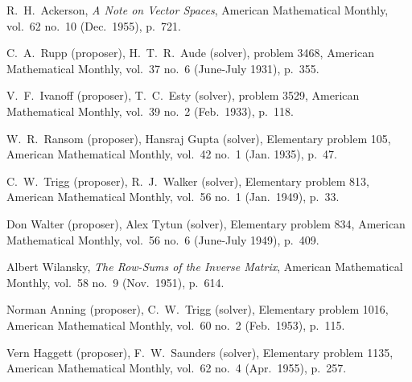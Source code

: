 \begin{thebibliography}{\makebox[2em][c]{{}\hfil{}}}
\thispagestyle{empty}
\small\setlength{\itemsep}{0ex} \setlength{\parsep}{0ex}
\raggedright


  R.\ H.\ Ackerson,
  \emph{A Note on Vector Spaces},
  American Mathematical Monthly,
  vol.\ 62 no.\ 10 (Dec.\ 1955),
  p.~721.


  C.\ A.\ Rupp (proposer), H.\ T.\ R.\ Aude (solver),
  problem 3468,
  American Mathematical Monthly,
  vol.\ 37 no.\ 6 (June-July 1931),
  p.~355.

  V.\ F.\ Ivanoff (proposer), T.\ C.\ Esty (solver),
  problem 3529,
  American Mathematical Monthly,
  vol.\ 39 no.\ 2 (Feb.\ 1933),
  p.~118.

  W.\ R.\ Ransom (proposer), Hansraj Gupta (solver),
  Elementary problem 105,
  American Mathematical Monthly,
  vol.\ 42 no.\ 1 (Jan. 1935),
  p.~47.

  C.\ W.\ Trigg (proposer), R.\ J.\ Walker (solver),
  Elementary problem 813,
  American Mathematical Monthly,
  vol.\ 56 no.\ 1 (Jan.\ 1949),
  p.~33.

  Don Walter (proposer), Alex Tytun (solver),
  Elementary problem 834,
  American Mathematical Monthly,
  vol.\ 56 no.\ 6 (June-July 1949),
  p.~409.

  Albert Wilansky,
  \emph{The Row-Sums of the Inverse Matrix},
  American Mathematical Monthly,
  vol.\ 58 no.\ 9 (Nov.\ 1951),
  p.~614.

  Norman Anning (proposer), C.\ W.\ Trigg (solver),
  Elementary problem 1016,
  American Mathematical Monthly,
  vol.\ 60 no.\ 2 (Feb.\ 1953),
  p.~115.

  Vern Haggett (proposer), F.\ W.\ Saunders (solver),
  Elementary problem 1135,
  American Mathematical Monthly,
  vol.\ 62 no.\ 4 (Apr.\ 1955),
  p.~257.


\end{thebibliography}
